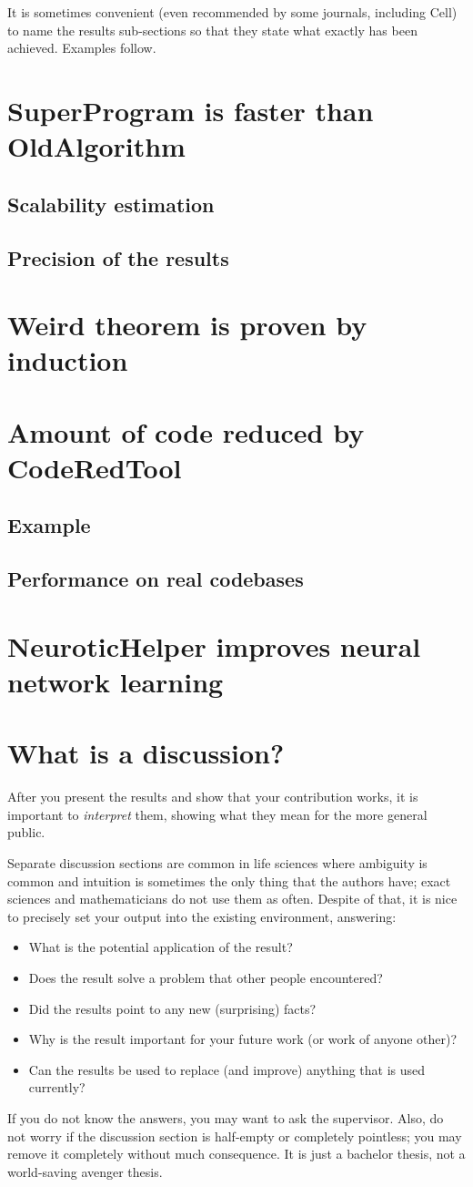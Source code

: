 It is sometimes convenient (even recommended by some journals, including Cell) to name the results sub-sections so that they state what exactly has been achieved. Examples follow.

\section{SuperProgram is faster than OldAlgorithm}
\subsection{Scalability estimation}
\subsection{Precision of the results}
\section{Weird theorem is proven by induction}
\section{Amount of code reduced by CodeRedTool}
\subsection{Example}
\subsection{Performance on real codebases}
\section{NeuroticHelper improves neural network learning}

\section{What is a discussion?}
After you present the results and show that your contribution works, it is important to \emph{interpret} them, showing what they mean for the more general public.

Separate discussion sections are common in life sciences where ambiguity is common and intuition is sometimes the only thing that the authors have; exact sciences and mathematicians do not use them as often. Despite of that, it is nice to precisely set your output into the existing environment, answering:
\begin{itemize}
\item What is the potential application of the result?
\item Does the result solve a problem that other people encountered?
\item Did the results point to any new (surprising) facts?
\item Why is the result important for your future work (or work of anyone other)?
\item Can the results be used to replace (and improve) anything that is used currently?
\end{itemize}

If you do not know the answers, you may want to ask the supervisor. Also, do not worry if the discussion section is half-empty or completely pointless; you may remove it completely without much consequence. It is just a bachelor thesis, not a world-saving avenger thesis.
\fi
